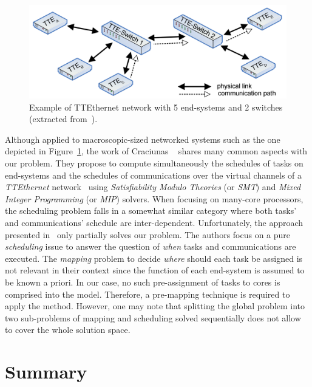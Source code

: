 \documentclass[main.tex]{subfiles}
\begin{document}
\begin{figure}
    \centering
    \includegraphics[width=12cm]{imgs/png/stateOfTheArt_2_TTEthernetNetwork.png}
    \caption{Example of TTEthernet network with 5 end-systems and 2 switches (extracted from~\cite{Craciunas2016}).}
    \label{fig_stateOfTheArt_2_TTEthernetNetwork}
\end{figure}
Although applied to macroscopic-sized networked systems such as the one depicted in Figure~\ref{fig_stateOfTheArt_2_TTEthernetNetwork}, the work of Craciunas \etal~\cite{Craciunas2016} shares many common aspects with our problem. They propose to compute simultaneously the schedules of tasks on end-systems and the schedules of communications over the virtual channels of a \emph{TTEthernet} network~\cite{ttethernet} using \emph{Satisfiability Modulo Theories} (or \emph{SMT}) and \emph{Mixed Integer Programming} (or \emph{MIP}) solvers. When focusing on many-core processors, the scheduling problem falls in a somewhat similar category where both tasks' and communications' schedule are inter-dependent. Unfortunately, the approach presented in~\cite{Craciunas2016} only partially solves our problem. The authors focus on a pure \emph{scheduling} issue to answer the question of \emph{when} tasks and communications are executed. The \emph{mapping} problem to decide \emph{where} should each task be assigned is not relevant in their context since the function of each end-system is assumed to be known a priori. In our case, no such pre-assignment of tasks to cores is comprised into the model. Therefore, a pre-mapping technique is required to apply the method. However, one may note that splitting the global problem into two sub-problems of mapping and scheduling solved sequentially does not allow to cover the whole solution space. 

\section{Summary}
\end{document}
